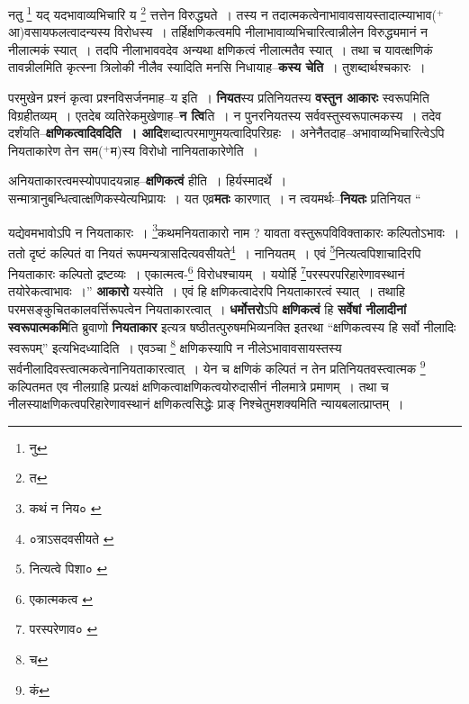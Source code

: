 \documentclass[article,12pt,a4paper]{memoir}
\newcommand{\add}[1]{($^{+}$#1)}
\begin{document}
	  \pstart नतु \footnote{नु} यद् यदभावाव्यभिचारि य \footnote{त} त्तत्तेन विरुद्ध्यते । तस्य न तदात्मकत्वेनाभावावसायस्तादात्म्याभाव\add{आ}वसायफलत्वादन्यस्य विरोधस्य । तर्हिक्षणिकत्वमपि नीलाभावाव्यभिचारित्वान्नीलेन विरुद्ध्यमानं न नीलात्मकं स्यात् । तदपि नीलाभाववदेव अन्यथा क्षणिकत्वं नीलात्मतैव स्यात् । तथा च यावत्क्षणिकं तावन्नीलमिति कृत्स्ना त्रिलोकी नीलैव स्यादिति मनसि निधायाह--\textbf{कस्य चेति} । तुशब्दार्थश्चकारः ।
	\pend
      

	  \pstart परमु\leavevmode{}खेन प्रश्नं कृत्वा प्रश्नविसर्जनमाह--य इति । \textbf{नियत}स्य प्रतिनियतस्य \textbf{वस्तुन आकारः} स्वरूपमिति विग्रहीतव्यम् । एतदेब व्यतिरेकमुखेणाह--\textbf{न त्वि}ति । न पुनरनियतस्य सर्ववस्तुस्वरूपात्मकस्य । तदेव दर्शंयति--\textbf{क्षणिकत्वादिवदिति । आदि}शब्दात्परमाणुमयत्वादिपरिग्रहः । अनेनैतदाह--अभावाव्यभिचारित्वेऽपि नियताकारेण तेन सम\add{म}स्य विरोधो नानियताकारेणेति ।
	\pend
      

	  \pstart अनियताकारत्वमस्योपपादयन्नाह--\textbf{क्षणिकत्वं} हीति । हिर्यस्मादर्थे । सन्मात्रानुबन्धित्वात्क्षणिकस्येत्यभिप्रायः । यत एव्र\textbf{मतः} कारणात् । न त्वयमर्थः--\textbf{नियतः} प्रतिनियत  \leavevmode{} “
	  
	यद्येवमभावोऽपि न नियताकारः । \footnote{कथं न निय० \cite{dp-msA} \cite{dp-msB} \cite{dp-edP} \cite{dp-edH} \cite{dp-edN}}कथमनियताकारो नाम ? यावता वस्तुरूपविविक्ताकारः कल्पितोऽभावः । ततो दृष्टं कल्पितं वा नियतं रूपमन्यत्रासदित्यवसीयते\footnote{०त्राऽसदवसीयते \cite{dp-msA} \cite{dp-msB} \cite{dp-msD} \cite{dp-edP} \cite{dp-edH} \cite{dp-edE} \cite{dp-edN}} । नानियतम् । एवं \footnote{नित्यत्वे पिशा० \cite{dp-msA} \cite{dp-edP} \cite{dp-edH}}नित्यत्वपिशाचादिरपि नियताकारः कल्पितो द्रष्टव्यः । एकात्मत्व-\footnote{एकात्मकत्व \cite{dp-msA} \cite{dp-msB} \cite{dp-msC} \cite{dp-msD} \cite{dp-edP} \cite{dp-edH} \cite{dp-edE} \cite{dp-edN}} विरोधश्चायम् । ययोर्हि \footnote{परस्परेणाव० \cite{dp-msB}}परस्परपरिहारेणावस्थानं तयोरेकत्वाभावः ।” \textbf{आकारो} यस्येति । एवं हि क्षणिकत्वादेरपि नियताकारत्वं स्यात् । तथाहि परमसङ्कुचितकालवर्त्तिरूपत्वेन नियताकारत्वात् । \textbf{धर्मोत्तरो}ऽपि \textbf{क्षणिकत्वं} हि \textbf{सर्वेषां नीलादीनां स्वरूपात्मकमि}ति ब्रुवाणो \textbf{नियताकार} इत्यत्र षष्ठीतत्पुरुषमभिव्यनक्ति इतरथा “क्षणिकत्वस्य हि सर्वो नीलादिः स्वरूपम्” इत्यभिदध्यादिति । एवञ्चा \footnote{च} क्षणिकस्यापि न नीलेऽभावावसायस्तस्य सर्वनीलादिवस्त्वात्मकत्वेनानियताकारत्वात् । येन च क्षणिकं कल्पितं न तेन प्रतिनियतवस्त्वात्मक \footnote{कं} कल्पितमत एव नीलग्राहि प्रत्यक्षं क्षणिकत्वाक्षणिकत्वयोरुदासीनं नीलमात्रे प्रमाणम् । तथा च नीलस्याक्षणिकत्वपरिहारेणावस्थानं क्षणिकत्वसिद्धेः प्राङ् निश्चेतुमशक्यमिति न्यायबलात्प्राप्तम् ।
	\pend
      
\end{document}
